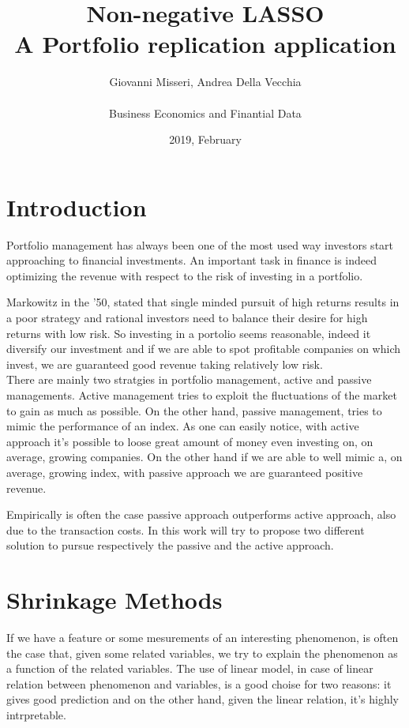 \documentclass{article}%
\title{%
  Non-negative LASSO \\
  \large A Portfolio replication application}
\date{2019, February}
\author{Giovanni Misseri, Andrea Della Vecchia \\ \\ 
Business Economics and Finantial Data}
\begin{document}
\maketitle
\tableofcontents
\newpage
\section{Introduction}

Portfolio management has always been one of the most used way investors start approaching to financial investments. An important task in finance is indeed optimizing the revenue with respect to the risk of investing in a portfolio.

Markowitz in the '50, stated that single minded pursuit of high returns results in a poor strategy and rational investors need to balance their desire for high returns with low risk. So investing in a portolio seems reasonable, indeed it diversify our investment and if we are able to spot profitable companies on which invest, we are guaranteed good revenue taking relatively low risk.
\\

There are mainly two stratgies in portfolio management, active and passive managements. Active management tries to exploit the fluctuations of the market to gain as much as possible. On the other hand, passive management, tries to mimic the performance of an index. As one can easily notice, with active approach it's possible to loose great amount of money even investing on, on average, growing companies. On the other hand if we are able to well mimic a, on average, growing index, with passive approach we are guaranteed positive revenue.

Empirically is often the case passive approach outperforms active approach, also due to the transaction costs. In this work will try to propose two different solution to pursue respectively the passive and the active approach.

\newpage
\section{Shrinkage Methods}

If we have a feature or some mesurements of an interesting phenomenon, is often the case that, given some related variables, we try to explain the phenomenon as a function of the related variables. The use of linear model, in case of linear relation between phenomenon and variables, is a good choise for two reasons: it gives good prediction and on the other hand, given the linear relation, it's highly intrpretable. 
\end{document}
